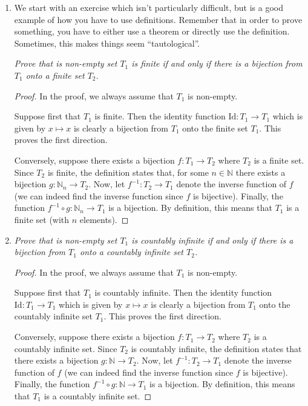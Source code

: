\documentclass[12pt, reqno]{article}
\numberwithin{equation}{section}
\theoremstyle{definition}
\theoremstyle{remark}
\newcommand{\NN}{\mathbb{N}}
\begin{document}
\begin{enumerate}[leftmargin=*]
	\item We start with an exercise which isn't particularly difficult, but is a good example of how you have to use definitions. Remember that in order to prove something, you have to either use a theorem or directly use the definition. Sometimes, this makes things seem ``tautological''.

	      \emph{Prove that is non-empty set $T_1$ is finite if and only if there is a bijection from $T_1$ onto a finite set $T_2$.}
	      \begin{proof} In the proof, we always assume that $T_1$ is non-empty.

		      Suppose first that $T_1$ is finite. Then the identity function $\mathrm{Id}: T_1 \to T_1$ which is given by $x\mapsto x$ is clearly a bijection from $T_1$ onto the finite set $T_1$. This proves the first direction.

		      Conversely, suppose there exists a bijection $f:T_1\to T_2$ where $T_2$ is a finite set. Since $T_2$ is finite, the definition states that, for some $n\in\NN$ there exists a bijection $g:\NN_n \to T_2$. Now, let $f^{-1} : T_2 \to T_1$ denote the inverse function of $f$ (we can indeed find the inverse function since $f$ is bijective). Finally, the function $f^{-1}\circ g : \NN_n \to T_1$ is a bijection. By definition, this means that $T_1$ is a finite set (with $n$ elements).
	      \end{proof}

	\item \emph{Prove that is non-empty set $T_1$ is countably infinite if and only if there is a bijection from $T_1$ onto a countably infinite set $T_2$.}
	      \begin{proof} In the proof, we always assume that $T_1$ is non-empty.

		      Suppose first that $T_1$ is countably infinite. Then the identity function $\mathrm{Id}: T_1 \to T_1$ which is given by $x\mapsto x$ is clearly a bijection from $T_1$ onto the countably infinite set $T_1$. This proves the first direction.

		      Conversely, suppose there exists a bijection $f:T_1\to T_2$ where $T_2$ is a countably infinite set. Since $T_2$ is countably infinite, the definition states that there exists a bijection $g:\NN \to T_2$. Now, let $f^{-1} : T_2 \to T_1$ denote the inverse function of $f$ (we can indeed find the inverse function since $f$ is bijective). Finally, the function $f^{-1}\circ g : \NN \to T_1$ is a bijection. By definition, this means that $T_1$ is a countably infinite set.
	      \end{proof}


\end{enumerate}
\end{document}
